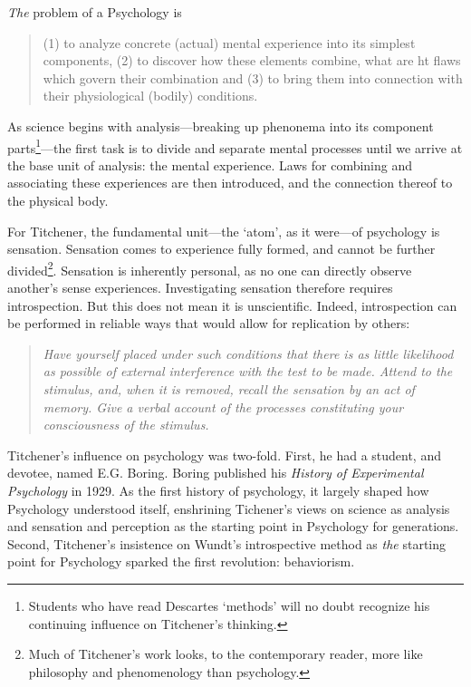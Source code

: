 \begin{refsection}
\emph{The} problem of a Psychology is

\begin{quote}

(1) to analyze concrete (actual) mental experience into its simplest components, (2) to discover how these elements combine, what are ht flaws which govern their combination and (3) to bring them into connection with their physiological (bodily) conditions. ~\citep[p. 12]{Titchener:1896tr}
\end{quote}

As science begins with analysis---breaking up phenonema into its component parts\footnote{Students who have read Descartes ‘methods’ will no doubt recognize his continuing influence on Titchener’s thinking.}---the first task is to divide and separate mental processes until we arrive at the base unit of analysis: the mental experience. Laws for combining and associating these experiences are then introduced, and the connection thereof to the physical body.

For Titchener, the fundamental unit---the ‘atom’, as it were---of psychology is sensation. Sensation comes to experience fully formed, and cannot be further divided\footnote{Much of Titchener’s work looks, to the contemporary reader, more like philosophy and phenomenology than psychology.}. Sensation is inherently personal, as no one can directly observe another’s sense experiences. Investigating sensation therefore requires introspection. But this does not mean it is unscientific. Indeed, introspection can be performed in reliable ways that would allow for replication by others:

\begin{quote}

\emph{Have yourself placed under such conditions that there is as little likelihood as possible of external interference with the test to be made. Attend to the stimulus, and, when it is removed, recall the sensation by an act of memory. Give a verbal account of the processes constituting your consciousness of the stimulus.} ~\citep[p. 36]{Titchener:1896tr}
\end{quote}

Titchener’s influence on psychology was two-fold. First, he had a student, and devotee, named E.G. Boring. Boring published his \emph{History of Experimental Psychology} in 1929. As the first history of psychology, it largely shaped how Psychology understood itself, enshrining Tichener’s views on science as analysis and sensation and perception as the starting point in Psychology for generations. Second, Titchener’s insistence on Wundt’s introspective method as \emph{the} starting point for Psychology sparked the first revolution: behaviorism.


\end{refsection}

